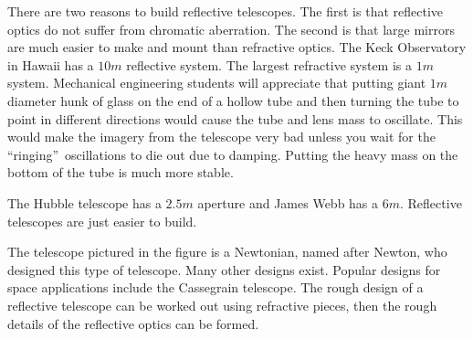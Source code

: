 \documentclass{article}
\begin{document}
There are two reasons to build reflective telescopes. The first is that
reflective optics do not suffer from chromatic aberration. The second is
that large mirrors are much easier to make and mount than refractive optics.
The Keck Observatory in Hawaii has a $10\unit{m}$ reflective system. The
largest refractive system is a $1\unit{m}$ system. Mechanical engineering
students will appreciate that putting giant $1\unit{m}$ diameter hunk of
glass on the end of a hollow tube and then turning the tube to point in
different directions would cause the tube and lens mass to oscillate. This
would make the imagery from the telescope very bad unless you wait for the
\textquotedblleft ringing\textquotedblright\ oscillations to die out due to
damping. Putting the heavy mass on the bottom of the tube is much more
stable.

The Hubble telescope has a $2.5\unit{m}$ aperture and James Webb has a $6%
\unit{m}$. Reflective telescopes are just easier to build.

The telescope pictured in the figure is a Newtonian, named after Newton, who
designed this type of telescope. Many other designs exist. Popular designs
for space applications include the Cassegrain telescope. The rough design of
a reflective telescope can be worked out using refractive pieces, then the
rough details of the reflective optics can be formed.
\end{document}
